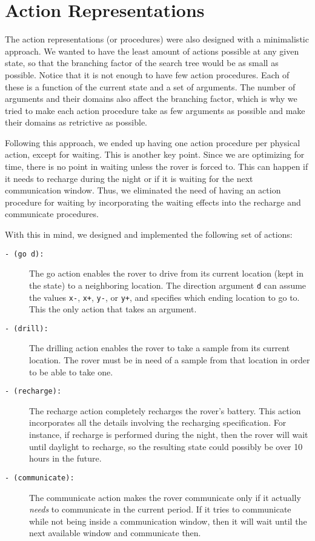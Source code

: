 \section{Action Representations} \label{actions}

The action representations (or procedures) were also designed with a minimalistic approach. We wanted to
have the least amount of actions possible at any given state, so that the branching factor of the search
tree would be as small as possible. Notice that it is not enough to have few action procedures. Each of
these is a function of the current state and a set of arguments. The number of arguments and their
domains also affect the branching factor, which is why we tried to make each action procedure take as few
arguments as possible and make their domains as retrictive as possible.

Following this approach, we ended up having one action procedure per physical action, except for waiting.
This is another key point. Since we are optimizing for time, there is no point in waiting unless the rover
is forced to. This can happen if it needs to recharge during the night or if it is waiting for the next
communication window. Thus, we eliminated the need of having an action procedure for waiting by
incorporating the waiting effects into the recharge and communicate procedures.

With this in mind, we designed and implemented the following set of actions:

\begin{description}
	\item[\texttt{- (go d):}] The go action enables the rover to drive from its current location (kept in
		the state) to a neighboring location. The direction argument \texttt{d} can assume the values
		\texttt{x-}, \texttt{x+}, \texttt{y-}, or \texttt{y+}, and specifies which ending location to go to.
		This the only action that takes an argument.
	\item[\texttt{- (drill):}] The drilling action enables the rover to take a sample from its current
		location. The rover must be in need of a sample from that location in order to be able to take one.
	\item[\texttt{- (recharge):}] The recharge action completely recharges the rover's battery. This
		action incorporates all the details involving the recharging specification. For instance, if recharge
		is performed during the night, then the rover will wait until daylight to recharge, so the resulting
		state could possibly be over 10 hours in the future.
	\item[\texttt{- (communicate):}] The communicate action makes the rover communicate only if it
		actually \emph{needs} to communicate in the current period. If it tries to communicate while
		not being inside a communication window, then it will wait until the next available window and
		communicate then.
\end{description}

